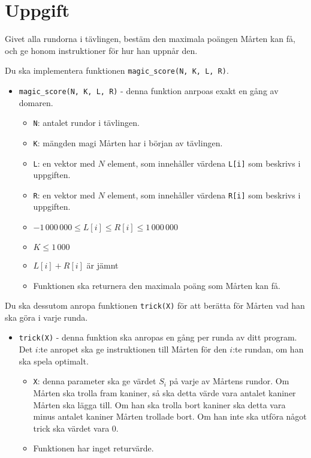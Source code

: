 \section*{Uppgift}
Givet alla rundorna i tävlingen, bestäm den maximala poängen Mårten kan få, och
ge honom instruktioner för hur han uppnår den.

Du ska implementera funktionen \texttt{magic\_score(N, K, L, R)}.
\begin{itemize}
  \item \texttt{magic\_score(N, K, L, R)} - denna funktion anrpoas exakt en gång av domaren.
  \begin{itemize}
    \item \texttt{N}: antalet rundor i tävlingen.
    \item \texttt{K}: mängden magi Mårten har i början av tävlingen.
    \item \texttt{L}: en vektor med $N$ element, som innehåller värdena \texttt{L[i]} som beskrivs i uppgiften.
    \item \texttt{R}: en vektor med $N$ element, som innehåller värdena \texttt{R[i]} som beskrivs i uppgiften.
    \item $-1\,000\,000 \le L[i] \le R[i] \le 1\,000\,000$
    \item $K \le 1\,000$
    \item $L[i] + R[i]$ är jämnt
    \item Funktionen ska returnera den maximala poäng som Mårten kan få.
  \end{itemize}

\end{itemize}

Du ska dessutom anropa funktionen \texttt{trick(X)} för att berätta för Mårten vad han ska göra i varje runda.
\begin{itemize}
  \item \texttt{trick(X)} - denna funktion ska anropas en gång per runda av ditt program.
    Det $i$:te anropet ska ge instruktionen till Mårten för den $i$:te rundan, om han ska spela optimalt.
  \begin{itemize}
    \item \texttt{X}: denna parameter ska ge värdet $S_i$ på varje av Mårtens rundor.
      Om Mårten ska trolla fram kaniner,
      så ska detta värde vara antalet kaniner Mårten ska lägga till. Om han ska trolla bort kaniner ska detta vara minus antalet kaniner Mårten trollade bort. 
      Om han inte ska utföra något trick ska värdet vara $0$.
    \item Funktionen har inget returvärde.
  \end{itemize}
\end{itemize}

